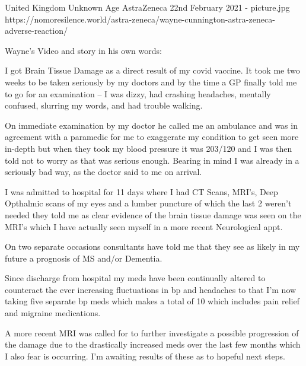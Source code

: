 {United Kingdom}
{Unknown Age}
{AstraZeneca}
{22nd February 2021}
{-}
{picture.jpg}
{https://nomoresilence.world/astra-zeneca/wayne-cunnington-astra-zeneca-adverse-reaction/}
{


Wayne’s Video and story in his own words:

I got Brain Tissue Damage as a direct result of my covid vaccine. It took me two weeks to be taken seriously by my doctors and by the time a GP finally told me to go for an examination – I was dizzy, had crashing headaches, mentally confused, slurring my words, and had trouble walking.

On immediate examination by my doctor he called me an ambulance and was in agreement with a paramedic for me to exaggerate my condition to get seen more in-depth but when they took my blood pressure it was 203/120 and I was then told not to worry as that was serious enough. Bearing in mind I was already in a seriously bad way, as the doctor said to me on arrival.

I was admitted to hospital for 11 days where I had CT Scans, MRI’s, Deep Opthalmic scans of my eyes and a lumber puncture of which the last 2 weren’t needed they told me as clear evidence of the brain tissue damage was seen on the MRI’s which I have actually seen myself in a more recent Neurological appt.

On two separate occasions consultants have told me that they see as likely in my future a prognosis of MS and/or Dementia.

Since discharge from hospital my meds have been continually altered to counteract the ever increasing fluctuations in bp and headaches to that I’m now taking five separate bp meds which makes a total of 10 which includes pain relief and migraine medications.

A more recent MRI was called for to further investigate a possible progression of the damage due to the drastically increased meds over the last few months which I also fear is occurring. I’m awaiting results of these as to hopeful next steps.
}
